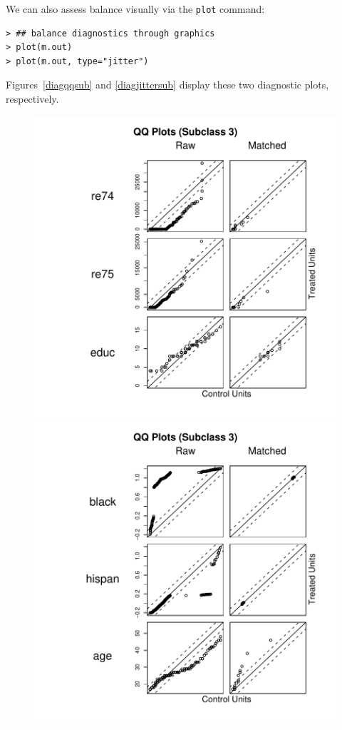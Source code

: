 \documentclass[oneside,letterpaper,titlepage]{article}
\begin{document}
We can also assess balance visually via the \texttt{plot} command: 
\begin{verbatim}
> ## balance diagnostics through graphics
> plot(m.out)
> plot(m.out, type="jitter")
\end{verbatim}    
Figures~\ref{diagqqsub} and \ref{diagjittersub} display these two
diagnostic plots, respectively.
\begin{figure}[tbp]
  \begin{center}
    \includegraphics[scale=.5]{figs/qqplotsub}
    \includegraphics[scale=.5]{figs/qqplotsub2}

\end{center}
\end{figure}
\end{document}
